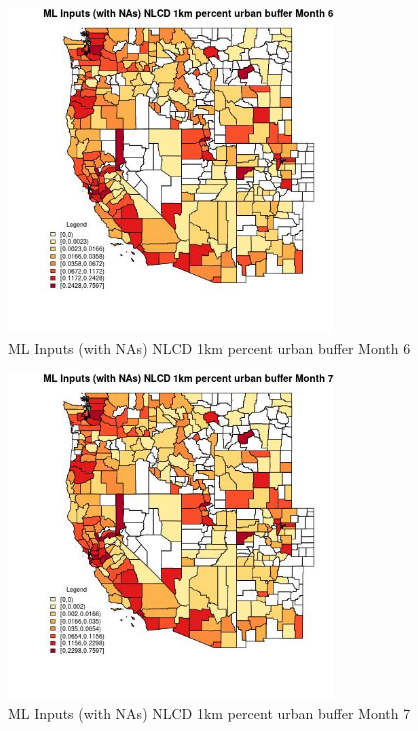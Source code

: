 \begin{figure} 
\centering  
\includegraphics[width=0.77\textwidth]{Code_Outputs/Report_ML_input_PM25_Step4_part_f_de_duplicated_aves_prioritize_24hr_obswNAs_CountyNLCD_1km_percent_urban_buffermedianMonth6.jpg} 
\caption{\label{fig:Report_ML_input_PM25_Step4_part_f_de_duplicated_aves_prioritize_24hr_obswNAsCountyNLCD_1km_percent_urban_buffermedianMonth6}ML Inputs (with NAs) NLCD 1km percent urban buffer Month 6} 
\end{figure} 
 

\begin{figure} 
\centering  
\includegraphics[width=0.77\textwidth]{Code_Outputs/Report_ML_input_PM25_Step4_part_f_de_duplicated_aves_prioritize_24hr_obswNAs_CountyNLCD_1km_percent_urban_buffermedianMonth7.jpg} 
\caption{\label{fig:Report_ML_input_PM25_Step4_part_f_de_duplicated_aves_prioritize_24hr_obswNAsCountyNLCD_1km_percent_urban_buffermedianMonth7}ML Inputs (with NAs) NLCD 1km percent urban buffer Month 7} 
\end{figure} 
 

